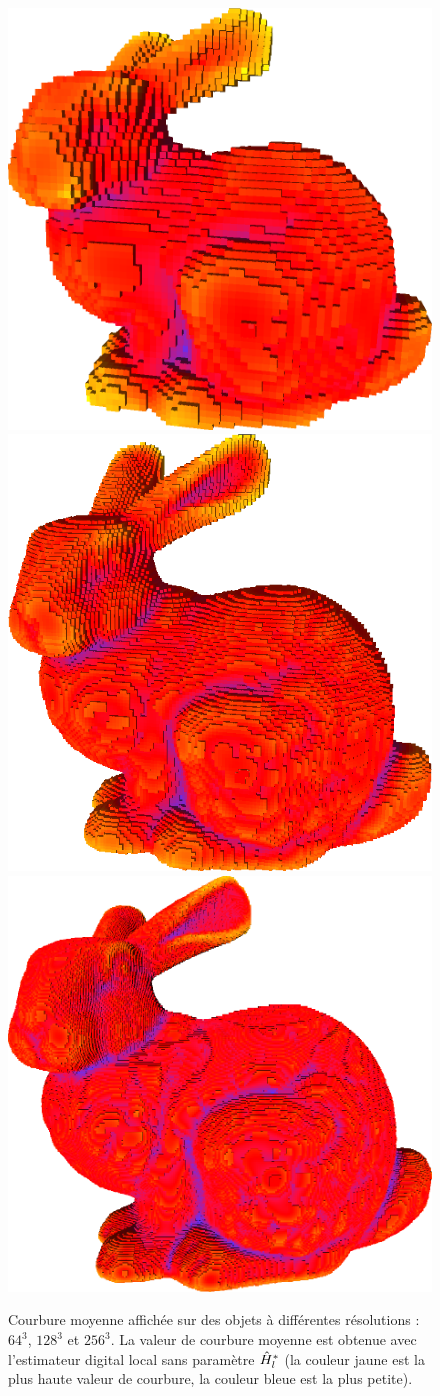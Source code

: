\begin{figure}[ht]
\begin{center}
  \includegraphics[width=.30\linewidth]{images/Curvature/Bunny_64_mean}
  \includegraphics[width=.30\linewidth]{images/Curvature/Bunny_128_mean}
  \includegraphics[width=.30\linewidth]{images/Curvature/Bunny_256_mean}
\end{center}
  \caption{Courbure moyenne affichée sur des objets \Bunny à différentes résolutions : $64^3$, $128^3$ et $256^3$. La valeur de courbure moyenne est obtenue avec l'estimateur digital local sans paramètre $\hat{H}^{*}_{l}$ (la couleur jaune est la plus haute valeur de courbure, la couleur bleue est la plus petite). \label{fig:mean-curv-different-scale}}
\end{figure}


